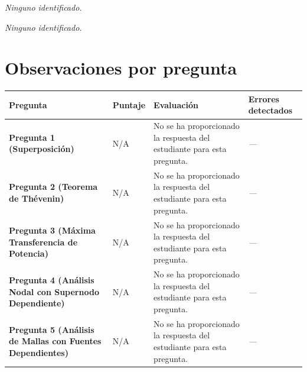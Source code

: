 \documentclass[11pt,a4paper]{article}
\begin{document}
\vspace{4pt}
\begin{minipage}[t]{0.48\linewidth}
  \begin{tcolorbox}[cajaFortaleza, title={Fortalezas}]
\textit{Ninguno identificado.}
  \end{tcolorbox}
\end{minipage}
\hfill
\begin{minipage}[t]{0.48\linewidth}
  \begin{tcolorbox}[cajaMejora, title={Areas de mejora}]
\textit{Ninguno identificado.}
  \end{tcolorbox}
\end{minipage}

\section*{Observaciones por pregunta}

\begin{longtable}{>{\bfseries}p{2.8cm} p{1.6cm} p{7.0cm} p{2.8cm}}
  \toprule
  \textbf{Pregunta} & \textbf{Puntaje} & \textbf{Evaluación} & \textbf{Errores detectados} \\
  \midrule
  \endhead
  \bottomrule
  \endfoot
    \textbf{Pregunta 1 (Superposición)} & N/A & No se ha proporcionado la respuesta del estudiante para esta pregunta. & \textit{---} \\
    \midrule
    \textbf{Pregunta 2 (Teorema de Thévenin)} & N/A & No se ha proporcionado la respuesta del estudiante para esta pregunta. & \textit{---} \\
    \midrule
    \textbf{Pregunta 3 (Máxima Transferencia de Potencia)} & N/A & No se ha proporcionado la respuesta del estudiante para esta pregunta. & \textit{---} \\
    \midrule
    \textbf{Pregunta 4 (Análisis Nodal con Supernodo Dependiente)} & N/A & No se ha proporcionado la respuesta del estudiante para esta pregunta. & \textit{---} \\
    \midrule
    \textbf{Pregunta 5 (Análisis de Mallas con Fuentes Dependientes)} & N/A & No se ha proporcionado la respuesta del estudiante para esta pregunta. & \textit{---} \\
    \midrule
\end{longtable}

\end{document}
